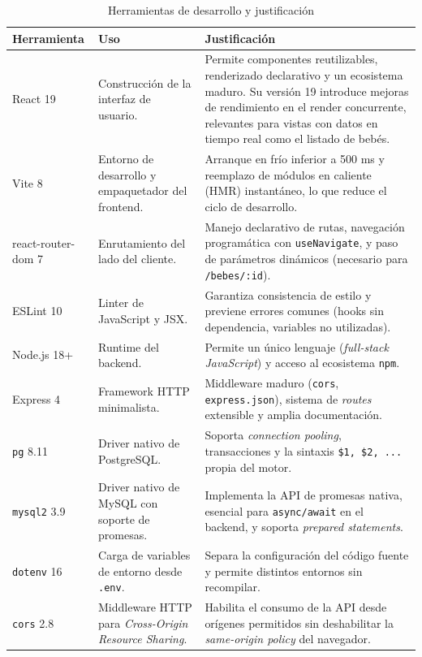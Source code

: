 \documentclass[12pt,letterpaper]{article}
\begin{document}
\begin{longtable}{p{}p{}p{}}
\caption{Herramientas de desarrollo y justificación}\\\toprule
\textbf{Herramienta} & \textbf{Uso} & \textbf{Justificación} \\\midrule
\endhead
React 19 & Construcción de la interfaz de usuario. & Permite componentes reutilizables, renderizado declarativo y un ecosistema maduro. Su versión 19 introduce mejoras de rendimiento en el render concurrente, relevantes para vistas con datos en tiempo real como el listado de bebés.\\\hline
Vite 8 & Entorno de desarrollo y empaquetador del frontend. & Arranque en frío inferior a 500 ms y reemplazo de módulos en caliente (HMR) instantáneo, lo que reduce el ciclo de desarrollo.\\\hline
react-router-dom 7 & Enrutamiento del lado del cliente. & Manejo declarativo de rutas, navegación programática con \texttt{useNavigate}, y paso de parámetros dinámicos (necesario para \texttt{/bebes/:id}).\\\hline
ESLint 10 & Linter de JavaScript y JSX. & Garantiza consistencia de estilo y previene errores comunes (hooks sin dependencia, variables no utilizadas).\\\hline
Node.js 18+ & Runtime del backend. & Permite un único lenguaje (\textit{full-stack JavaScript}) y acceso al ecosistema \texttt{npm}.\\\hline
Express 4 & Framework HTTP minimalista. & Middleware maduro (\texttt{cors}, \texttt{express.json}), sistema de \textit{routes} extensible y amplia documentación.\\\hline
\texttt{pg} 8.11 & Driver nativo de PostgreSQL. & Soporta \textit{connection pooling}, transacciones y la sintaxis \texttt{\$1, \$2, ...} propia del motor.\\\hline
\texttt{mysql2} 3.9 & Driver nativo de MySQL con soporte de promesas. & Implementa la API de promesas nativa, esencial para \texttt{async/await} en el backend, y soporta \textit{prepared statements}.\\\hline
\texttt{dotenv} 16 & Carga de variables de entorno desde \texttt{.env}. & Separa la configuración del código fuente y permite distintos entornos sin recompilar.\\\hline
\texttt{cors} 2.8 & Middleware HTTP para \textit{Cross-Origin Resource Sharing}. & Habilita el consumo de la API desde orígenes permitidos sin deshabilitar la \textit{same-origin policy} del navegador.\\\hline

\end{longtable}
\end{document}
